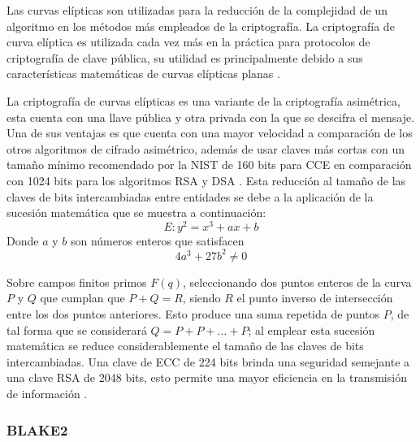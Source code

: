 \documentclass{article}
\begin{document}
                Las curvas elípticas son utilizadas para la reducción de la complejidad de un algoritmo en los métodos más empleados de la criptografía. La criptografía de curva elíptica es utilizada cada vez más en la práctica para protocolos de criptografía de clave pública, su utilidad es principalmente debido a sus características matemáticas de curvas elípticas planas \cite{sanchez2021solucion}.

                La criptografía de curvas elípticas es una variante de la criptografía asimétrica, esta cuenta con una llave pública y otra privada con la que se descifra el mensaje. Una de sus ventajas es que cuenta con una mayor velocidad a comparación de los otros algoritmos de cifrado asimétrico, además de usar claves más cortas con un tamaño mínimo recomendado por la NIST de 160 bits para CCE en comparación con 1024 bits para los algoritmos RSA y DSA \cite{ramirez2018sistemas}. Esta reducción al tamaño de las claves de bits intercambiadas entre entidades se debe a la aplicación de la sucesión matemática que se muestra a continuación:
                \begin{equation}
                    E:y^2=x^3 + ax + b
                \end{equation}
                Donde $a$ y $b$ son números enteros que satisfacen
                \begin{equation}
                    4a^3 + 27b^2 \neq 0
                \end{equation}

                Sobre campos finitos primos $F(q)$, seleccionando dos puntos enteros de la curva $P$ y $Q$ que cumplan que $P+Q=R$, siendo $R$ el punto inverso de intersección entre los dos puntos anteriores. Esto produce una suma repetida de puntos $P$, de tal forma que se considerará $Q=P+P+...+P$; al emplear esta sucesión matemática se reduce considerablemente el tamaño de las claves de bits intercambiadas. Una clave de ECC de 224 bits brinda una seguridad semejante a una clave RSA de 2048 bits, esto permite una mayor eficiencia en la transmisión de información \cite{sanchez2021solucion}.

            \subsubsection{BLAKE2}
\end{document}
